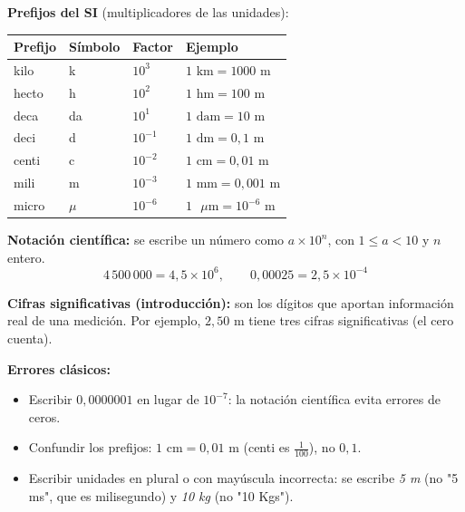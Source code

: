 \documentclass[12pt, letterpaper]{article}
\begin{document}
\begin{cuadroteoria}
  \textbf{Prefijos del SI} (multiplicadores de las unidades):
  \begin{center}
    \begin{tabular}{llll}
      \toprule
      Prefijo & Símbolo & Factor    & Ejemplo                                     \\
      \midrule
      kilo    & k       & $10^{3}$  & $1 \text{ km} = 1000 \text{ m}$             \\
      hecto   & h       & $10^{2}$  & $1 \text{ hm} = 100 \text{ m}$              \\
      deca    & da      & $10^{1}$  & $1 \text{ dam} = 10 \text{ m}$              \\
      deci    & d       & $10^{-1}$ & $1 \text{ dm} = 0{,}1 \text{ m}$            \\
      centi   & c       & $10^{-2}$ & $1 \text{ cm} = 0{,}01 \text{ m}$           \\
      mili    & m       & $10^{-3}$ & $1 \text{ mm} = 0{,}001 \text{ m}$          \\
      micro   & $\mu$   & $10^{-6}$ & $1 \text{ }\mu\text{m} = 10^{-6} \text{ m}$ \\
      \bottomrule
    \end{tabular}
  \end{center}
\end{cuadroteoria}

\begin{cuadroteoria}
  \textbf{Notación científica:} se escribe un número como $a \times 10^{n}$, con $1 \le a < 10$ y $n$ entero.
  $$4\,500\,000 = 4{,}5 \times 10^{6}, \qquad 0{,}00025 = 2{,}5 \times 10^{-4}$$

  \textbf{Cifras significativas (introducción):} son los dígitos que aportan información real de una medición. Por ejemplo, $2{,}50$ m tiene tres cifras significativas (el cero cuenta).
\end{cuadroteoria}

\begin{cuadroadvertencia}
  \textbf{Errores clásicos:}
  \begin{itemize}[leftmargin=*]
    \item Escribir $0{,}0000001$ en lugar de $10^{-7}$: la notación científica evita errores de ceros.
    \item Confundir los prefijos: $1 \text{ cm} = 0{,}01 \text{ m}$ (centi es $\frac{1}{100}$), no $0{,}1$.
    \item Escribir unidades en plural o con mayúscula incorrecta: se escribe \emph{5 m} (no "5 ms", que es milisegundo) y \emph{10 kg} (no "10 Kgs").
  \end{itemize}
\end{cuadroadvertencia}
\end{document}
